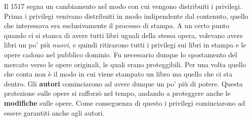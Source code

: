 Il 1517 segna un cambiamento nel modo con cui vengono distribuiti i privilegi. Prima i privilegi venivano distribuiti in modo indipendente dal contenuto, quello che interessava era esclusivamente il processo di stampa. A un certo punto quando ci si stanca di avere tutti libri uguali della stessa opera, volevano avere libri un po' più \textit{nuovi}, e quindi ritirarono tutti i privilegi sui libri in stampa e le opere cadono nel pubblico dominio. Fu necessario dunque lo spostamento del mercato verso le opere originali, le quali erano proteggibili. Per una volta quello che conta non è il modo in cui viene stampato un libro ma quello che ci sta dentro. Gli \textbf{autori} cominciarono ad avere dunque un po' più di potere. Questa protezione sulle opere si rafforzò nel tempo, andando a proteggere anche le \textbf{modifiche} sulle opere. Come conseguenza di questo i privilegi cominciarono ad essere garantiti anche agli autori.  

